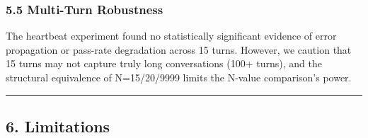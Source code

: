 \subsubsection{5.5 Multi-Turn Robustness}\label{multi-turn-robustness}



The heartbeat experiment found no statistically significant evidence of error propagation or pass-rate degradation across 15 turns. However, we caution that 15 turns may not capture truly long conversations (100+ turns), and the structural equivalence of N=15/20/9999 limits the N-value comparison's power.



\begin{center}\rule{0.5\linewidth}{0.5pt}\end{center}



\subsection{6. Limitations}\label{limitations}




